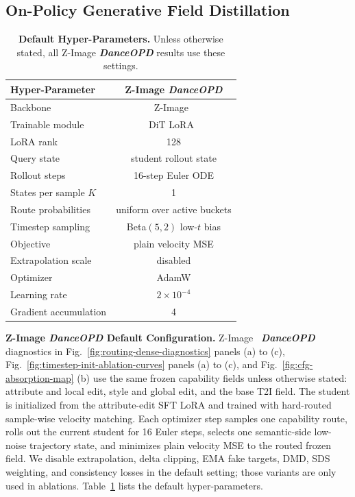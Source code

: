 \documentclass{llmxive}
\providecommand{\name}{\textsl{\textbf{DanceOPD}}\xspace}
\begin{document}
\vspace{0.2cm}


\subsection{On-Policy Generative Field Distillation}
\label{sec:settings}


\begin{table}[t]
  \centering
  \setlength{\tabcolsep}{6pt}
  \vspace{-0.2cm}
  \begin{tabular}{lc}
    \toprule
    \textbf{Hyper-Parameter} & \textbf{Z-Image \name{}}\\
    \midrule
    Backbone & Z-Image~\cite{cai2025z}\\
    Trainable module & DiT LoRA~\cite{hu2022lora}\\
    LoRA rank & 128\\
    Query state & student rollout state\\
    Rollout steps & 16-step Euler ODE\\
    States per sample $K$ & 1\\
    Route probabilities & uniform over active buckets\\
    Timestep sampling & Beta$(5,2)$ low-$t$ bias\\
    Objective & plain velocity MSE\\
    Extrapolation scale & disabled\\
    Optimizer & AdamW\\
    Learning rate & $2\times10^{-4}$\\
    Gradient accumulation & 4\\
    \bottomrule
  \end{tabular}
\caption{\textbf{Default Hyper-Parameters.} Unless otherwise stated, all Z-Image \name{} results use these settings.}
\label{tab:settings}
\end{table}


\noindent\textbf{Z-Image \name{} Default Configuration.}
Z-Image~\cite{cai2025z} \name{} diagnostics in Fig.~\ref{fig:routing-dense-diagnostics} panels (a) to (c), Fig.~\ref{fig:timestep-init-ablation-curves} panels (a) to (c), and Fig.~\ref{fig:cfg-absorption-map} (b) use the same frozen capability fields unless otherwise stated: attribute and local edit, style and global edit, and the base T2I field. The student is initialized from the attribute-edit SFT LoRA and trained with hard-routed sample-wise velocity matching. Each optimizer step samples one capability route, rolls out the current student for 16 Euler steps, selects one semantic-side low-noise trajectory state, and minimizes plain velocity MSE to the routed frozen field. We disable extrapolation, delta clipping, EMA fake targets, DMD, SDS weighting, and consistency losses in the default setting; those variants are only used in ablations. Table~\ref{tab:settings} lists the default hyper-parameters.
\end{document}
